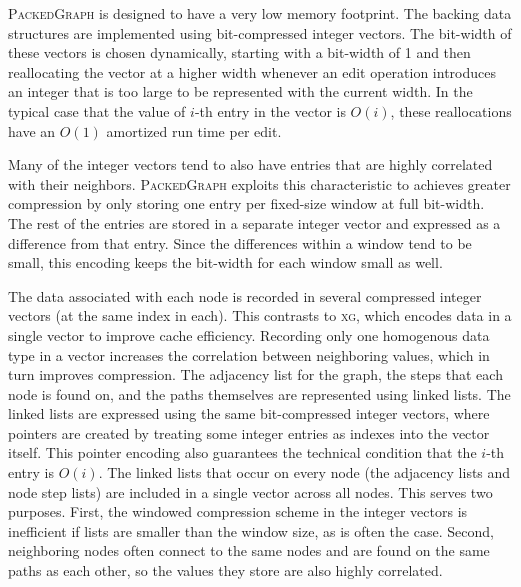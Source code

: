 \documentclass{bioinfo}
\begin{document}
\begin{methods}
\textsc{PackedGraph} is designed to have a very low memory footprint.
The backing data structures are implemented using bit-compressed integer vectors.
The bit-width of these vectors is chosen dynamically, starting with a bit-width of 1 and  then reallocating the vector at a higher width whenever an edit operation introduces an integer that is too large to be represented with the current width.
In the typical case that the value of $i$-th entry in the vector is $O(i)$, these reallocations have an  $O(1)$ amortized run time per edit.

Many of the integer vectors tend to also have entries that are highly correlated with their neighbors.
\textsc{PackedGraph} exploits this characteristic to achieves greater compression by only storing one entry per fixed-size window at full bit-width.
 The rest of the entries are stored in a separate integer vector and expressed as a difference from that entry.
 Since the differences within a window tend to be small, this encoding keeps the bit-width for each window small as well.

The data associated with each node is recorded in several compressed integer vectors (at the same index in each).
This contrasts to \textsc{xg}, which encodes data in a single vector to improve cache efficiency.
Recording only one homogenous data type in a vector increases the correlation between neighboring values, which in turn improves compression.
The adjacency list for the graph, the steps that each node is found on, and the paths themselves are represented using linked lists.
The linked lists are expressed using the same bit-compressed integer vectors, where pointers are created by treating some integer entries as indexes into the vector itself.
This pointer encoding also guarantees the technical condition that the $i$-th entry is $O(i)$.
The linked lists that occur on every node (the adjacency lists and node step lists) are included in a single vector across all nodes.
This serves two purposes.
First, the windowed compression scheme in the integer vectors is inefficient if lists are smaller than the window size, as is often the case.
Second, neighboring nodes often connect to the same nodes and are found on the same paths as each other, so the values they store are also highly correlated.


\end{methods}
\end{document}
